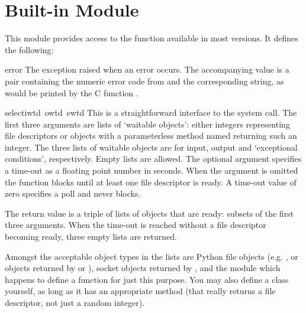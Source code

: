 \section{Built-in Module }

This module provides access to the function  available in
most \UNIX{} versions.  It defines the following:

\renewcommand{\indexsubitem}{(in module select)}
\begin{excdesc}{error}
The exception raised when an error occurs.  The accompanying value is
a pair containing the numeric error code from  and the
corresponding string, as would be printed by the C function
.
\end{excdesc}

\begin{funcdesc}{select}{iwtd\, owtd\, ewtd}
This is a straightforward interface to the \UNIX{} 
system call.  The first three arguments are lists of `waitable
objects': either integers representing \UNIX{} file descriptors or
objects with a parameterless method named  returning
such an integer.  The three lists of waitable objects are for input,
output and `exceptional conditions', respectively.  Empty lists are
allowed.  The optional  argument specifies a time-out as a
floating point number in seconds.  When the  argument
is omitted the function blocks until at least one file descriptor is
ready.  A time-out value of zero specifies a poll and never blocks.

The return value is a triple of lists of objects that are ready:
subsets of the first three arguments.  When the time-out is reached
without a file descriptor becoming ready, three empty lists are
returned.

Amongst the acceptable object types in the lists are Python file
objects (e.g. , or objects returned by 
or ), socket objects returned by
, and the module  which happens to
define a function  for just this purpose.  You may
also define a  class yourself, as long as it has an
appropriate  method (that really returns a \UNIX{} file
descriptor, not just a random integer).
\end{funcdesc}
